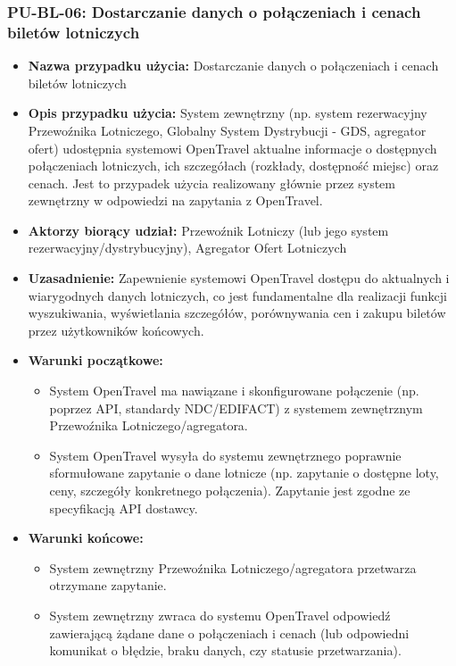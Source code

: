 \documentclass[a4paper,12pt]{article}
\begin{document}
\subsubsection{PU-BL-06: Dostarczanie danych o połączeniach i cenach biletów lotniczych}
\begin{itemize}
    \item \textbf{Nazwa przypadku użycia:} Dostarczanie danych o połączeniach i cenach biletów lotniczych
    \item \textbf{Opis przypadku użycia:} System zewnętrzny (np. system rezerwacyjny Przewoźnika Lotniczego, Globalny System Dystrybucji - GDS, agregator ofert) udostępnia systemowi OpenTravel aktualne informacje o dostępnych połączeniach lotniczych, ich szczegółach (rozkłady, dostępność miejsc) oraz cenach. Jest to przypadek użycia realizowany głównie przez system zewnętrzny w odpowiedzi na zapytania z OpenTravel.
    \item \textbf{Aktorzy biorący udział:} Przewoźnik Lotniczy (lub jego system rezerwacyjny/dystrybucyjny), Agregator Ofert Lotniczych
    \item \textbf{Uzasadnienie:} Zapewnienie systemowi OpenTravel dostępu do aktualnych i wiarygodnych danych lotniczych, co jest fundamentalne dla realizacji funkcji wyszukiwania, wyświetlania szczegółów, porównywania cen i zakupu biletów przez użytkowników końcowych.
    \item \textbf{Warunki początkowe:}
        \begin{itemize}
            \item System OpenTravel ma nawiązane i skonfigurowane połączenie (np. poprzez API, standardy NDC/EDIFACT) z systemem zewnętrznym Przewoźnika Lotniczego/agregatora.
            \item System OpenTravel wysyła do systemu zewnętrznego poprawnie sformułowane zapytanie o dane lotnicze (np. zapytanie o dostępne loty, ceny, szczegóły konkretnego połączenia). Zapytanie jest zgodne ze specyfikacją API dostawcy.
        \end{itemize}
    \item \textbf{Warunki końcowe:}
        \begin{itemize}
            \item System zewnętrzny Przewoźnika Lotniczego/agregatora przetwarza otrzymane zapytanie.
            \item System zewnętrzny zwraca do systemu OpenTravel odpowiedź zawierającą żądane dane o połączeniach i cenach (lub odpowiedni komunikat o błędzie, braku danych, czy statusie przetwarzania).

\end{itemize}
\end{itemize}
\end{document}
